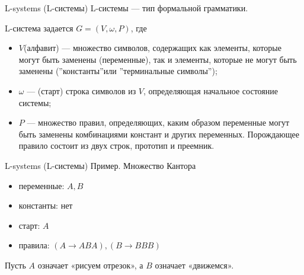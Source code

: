 \documentclass{beamer}
\begin{document}
	\begin{frame}{L-systems (L-системы)}
		L-системы --- тип формальной грамматики.

		L-система задается $G = (V, \omega, P )$, где
	
		\begin{itemize}
			\item $V$(алфавит) --- множество символов, содержащих как элементы, которые могут быть заменены (переменные), так и элементы, которые не могут быть заменены (”константы”или ”терминальные символы”);
			\item $\omega$ --- (старт) строка символов из $V$, определяющая начальное состояние системы;
			\item $P$ --- множество правил, определяющих, каким образом переменные могут быть заменены комбинациями констант и других переменных. Порождающее правило состоит из двух строк, прототип и преемник.
		\end{itemize}

	\end{frame}

	\begin{frame}{L-systems (L-системы)}
		Пример. Множество Кантора
	
		\begin{itemize}
			\item переменные: $A, B$
			\item константы: нет
			\item старт: $A$
			\item правила: $(A \to ABA), (B \to BBB)$
		\end{itemize}

		Пусть $A$ означает «рисуем отрезок», а $B$ означает «движемся».
		
	\end{frame}
\end{document}
